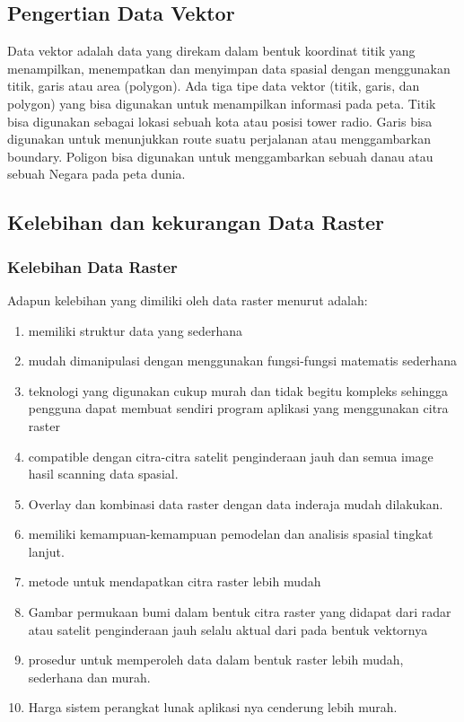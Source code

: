 \subsection{Pengertian Data Vektor}
Data vektor adalah data yang direkam dalam bentuk koordinat titik yang menampilkan, 
menempatkan dan menyimpan data spasial dengan menggunakan titik, 
garis atau area (polygon). Ada tiga tipe data vektor (titik, garis, 
dan polygon) yang bisa digunakan untuk menampilkan informasi pada peta. 
Titik bisa digunakan sebagai lokasi sebuah kota atau posisi tower radio. 
Garis bisa digunakan untuk menunjukkan route suatu perjalanan atau menggambarkan boundary. 
Poligon bisa digunakan untuk menggambarkan sebuah danau atau sebuah Negara pada peta dunia.

\subsection{Kelebihan dan kekurangan Data Raster}
\subsubsection{Kelebihan Data Raster}
Adapun kelebihan yang dimiliki oleh data raster menurut \cite{irwansyah2013sistem} adalah: 
	\begin{enumerate}
		\item memiliki struktur data yang sederhana
		\item mudah dimanipulasi dengan menggunakan fungsi-fungsi matematis sederhana
		\item teknologi yang digunakan cukup murah dan tidak begitu kompleks sehingga pengguna dapat membuat sendiri program aplikasi yang menggunakan citra raster
		\item compatible dengan citra-citra satelit penginderaan jauh dan semua image hasil scanning data spasial.
		\item Overlay dan kombinasi data raster dengan data inderaja mudah dilakukan.
		\item memiliki kemampuan-kemampuan pemodelan dan analisis  spasial tingkat lanjut.
		\item metode untuk mendapatkan citra raster lebih mudah
		\item Gambar permukaan bumi dalam bentuk citra raster yang didapat dari radar atau satelit penginderaan jauh selalu aktual dari pada bentuk vektornya
		\item prosedur untuk memperoleh data dalam bentuk raster lebih mudah, sederhana dan murah.
		\item Harga sistem perangkat lunak aplikasi nya cenderung lebih murah.
	\end{enumerate}


